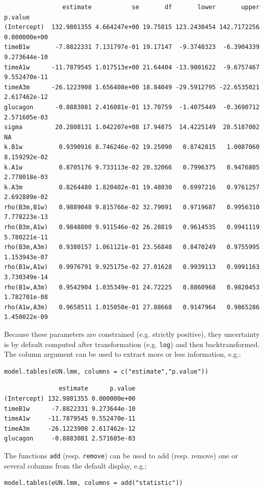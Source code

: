 \documentclass[12pt]{article}
\begin{document}
\begin{verbatim}
                estimate           se       df       lower       upper      p.value
(Intercept)  132.9801355 4.664247e+00 19.75815 123.2430454 142.7172256 0.000000e+00
timeB1w       -7.8822331 7.131797e-01 19.17147  -9.3740323  -6.3904339 9.273644e-10
timeA1w      -11.7879545 1.017513e+00 21.64404 -13.9001622  -9.6757467 9.552470e-11
timeA3m      -26.1223908 1.656408e+00 18.84049 -29.5912795 -22.6535021 2.617462e-12
glucagon      -0.8883081 2.416081e-01 13.70759  -1.4075449  -0.3690712 2.571605e-03
sigma         20.2808131 1.042207e+08 17.94875  14.4225149  28.5187002           NA
k.B1w          0.9390916 8.746246e-02 19.25090   0.8742815   1.0087060 8.159292e-02
k.A1w          0.8705176 9.733113e-02 20.32066   0.7996375   0.9476805 2.778018e-03
k.A3m          0.8264480 1.820402e-01 19.48030   0.6997216   0.9761257 2.692889e-02
rho(B3m,B1w)   0.9889048 9.815766e-02 32.79091   0.9719687   0.9956310 7.778223e-13
rho(B3m,A1w)   0.9848800 9.911546e-02 26.28819   0.9614535   0.9941119 5.780221e-11
rho(B3m,A3m)   0.9380157 1.061121e-01 23.56848   0.8470249   0.9755995 1.153943e-07
rho(B1w,A1w)   0.9976791 9.925175e-02 27.01628   0.9939113   0.9991163 3.730349e-14
rho(B1w,A3m)   0.9542904 1.035349e-01 24.72225   0.8860968   0.9820453 1.782701e-08
rho(A1w,A3m)   0.9658511 1.015050e-01 27.88668   0.9147964   0.9865286 1.450022e-09
\end{verbatim}

Because these parameters are constrained (e.g. strictly positive),
they uncertainty is by default computed after transformation
(e.g. \texttt{log}) and then backtransformed. The column argument can be used
to extract more or less information, e.g.:
\lstset{language=r,label= ,caption= ,captionpos=b,numbers=none}
\begin{lstlisting}
model.tables(eUN.lmm, columns = c("estimate","p.value"))
\end{lstlisting}

\begin{verbatim}
               estimate      p.value
(Intercept) 132.9801355 0.000000e+00
timeB1w      -7.8822331 9.273644e-10
timeA1w     -11.7879545 9.552470e-11
timeA3m     -26.1223908 2.617462e-12
glucagon     -0.8883081 2.571605e-03
\end{verbatim}


The functions \texttt{add} (resp. \texttt{remove}) can be used to add (resp. remove)
one or several columns from the default display, e.g.:
\lstset{language=r,label= ,caption= ,captionpos=b,numbers=none}
\begin{lstlisting}
model.tables(eUN.lmm, columns = add("statistic"))
\end{lstlisting}
\end{document}
